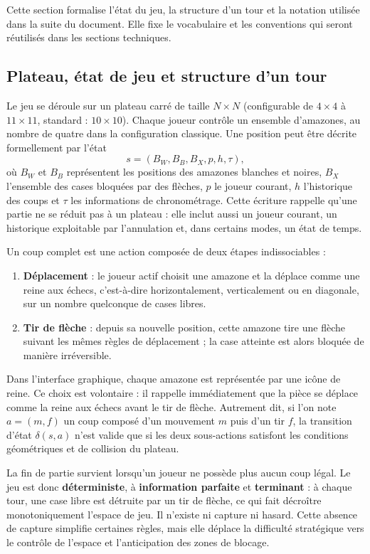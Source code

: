 \documentclass[a4paper]{article}
\begin{document}
Cette section formalise l'état du jeu, la structure d'un tour et la notation utilisée dans la suite du document. Elle fixe le vocabulaire et les conventions qui seront réutilisés dans les sections techniques.

\subsection{Plateau, état de jeu et structure d'un tour}

Le jeu se déroule sur un plateau carré de taille $N \times N$ (configurable de $4 \times 4$ à $11 \times 11$, standard : $10 \times 10$). Chaque joueur contrôle un ensemble d'amazones, au nombre de quatre dans la configuration classique. Une position peut être décrite formellement par l'état
\[
s = (B_W, B_B, B_X, p, h, \tau),
\]
où $B_W$ et $B_B$ représentent les positions des amazones blanches et noires, $B_X$ l'ensemble des cases bloquées par des flèches, $p$ le joueur courant, $h$ l'historique des coups et $\tau$ les informations de chronométrage. Cette écriture rappelle qu'une partie ne se réduit pas à un plateau : elle inclut aussi un joueur courant, un historique exploitable par l'annulation et, dans certains modes, un état de temps.

Un coup complet est une action composée de deux étapes indissociables :
\begin{enumerate}
    \item \textbf{Déplacement} : le joueur actif choisit une amazone et la déplace comme une reine aux échecs, c'est-à-dire horizontalement, verticalement ou en diagonale, sur un nombre quelconque de cases libres.
    \item \textbf{Tir de flèche} : depuis sa nouvelle position, cette amazone tire une flèche suivant les mêmes règles de déplacement ; la case atteinte est alors bloquée de manière irréversible.
\end{enumerate}
Dans l'interface graphique, chaque amazone est représentée par une icône de reine. Ce choix est volontaire : il rappelle immédiatement que la pièce se déplace comme la reine aux échecs avant le tir de flèche.
Autrement dit, si l'on note $a=(m,f)$ un coup composé d'un mouvement $m$ puis d'un tir $f$, la transition d'état $\delta(s,a)$ n'est valide que si les deux sous-actions satisfont les conditions géométriques et de collision du plateau.

La fin de partie survient lorsqu'un joueur ne possède plus aucun coup légal. Le jeu est donc \textbf{déterministe}, à \textbf{information parfaite} et \textbf{terminant} : à chaque tour, une case libre est détruite par un tir de flèche, ce qui fait décroître monotoniquement l'espace de jeu. Il n'existe ni capture ni hasard. Cette absence de capture simplifie certaines règles, mais elle déplace la difficulté stratégique vers le contrôle de l'espace et l'anticipation des zones de blocage.
\end{document}
